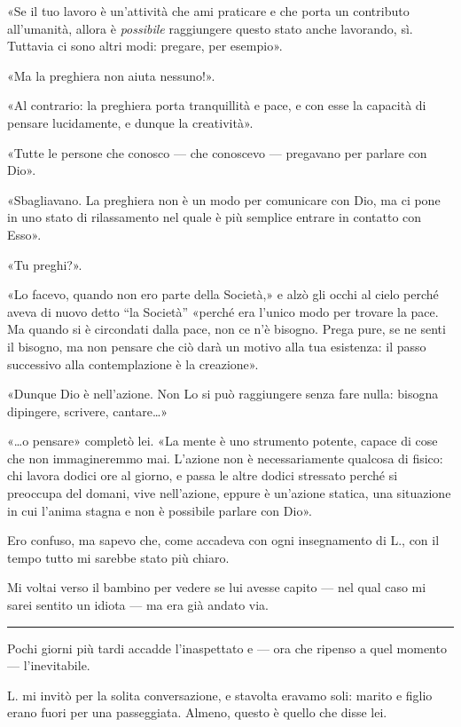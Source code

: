 \documentclass[a4paper,10pt]{memoir}
\begin{document}
«Se il tuo lavoro è un'attività che ami praticare e che porta un contributo all'umanità, allora è \emph{possibile}
raggiungere questo stato anche lavorando, sì. Tuttavia ci sono altri modi: pregare, per esempio».

«Ma la preghiera non aiuta nessuno!».

«Al contrario: la preghiera porta tranquillità e pace, e con esse la capacità di pensare lucidamente, e dunque la
creatività».

«Tutte le persone che conosco --- che conoscevo --- pregavano per parlare con Dio».

«Sbagliavano. La preghiera non è un modo per comunicare con Dio, ma ci pone in uno stato di rilassamento nel quale è più
semplice entrare in contatto con Esso».

«Tu preghi?».

«Lo facevo, quando non ero parte della Società,» e alzò gli occhi al cielo perché aveva di nuovo detto ``la Società''
«perché era l'unico modo per trovare la pace. Ma quando si è circondati dalla pace, non ce n'è bisogno. Prega pure, se
ne senti il bisogno, ma non pensare che ciò darà un motivo alla tua esistenza: il passo successivo alla contemplazione è
la creazione».

«Dunque Dio è nell'azione. Non Lo si può raggiungere senza fare nulla: bisogna dipingere, scrivere, cantare\dots{}»

«\dots{}o pensare» completò lei. «La mente è uno strumento potente, capace di cose che non immagineremmo mai. L'azione
non è necessariamente qualcosa di fisico: chi lavora dodici ore al giorno, e passa le altre dodici stressato perché si
preoccupa del domani, vive nell'azione, eppure è un'azione statica, una situazione in cui l'anima stagna e non è
possibile parlare con Dio».

Ero confuso, ma sapevo che, come accadeva con ogni insegnamento di L., con il tempo tutto mi sarebbe stato più chiaro.

Mi voltai verso il bambino per vedere se lui avesse capito --- nel qual caso mi sarei sentito un idiota --- ma era già
andato via.

\plainbreak{1}

Pochi giorni più tardi accadde l'inaspettato e --- ora che ripenso a quel momento --- l'inevitabile.

L. mi invitò per la solita conversazione, e stavolta eravamo soli: marito e figlio erano fuori per una passeggiata.
Almeno, questo è quello che disse lei.
\end{document}
